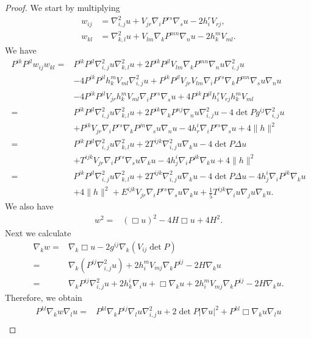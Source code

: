 \documentclass{amsart}
\theoremstyle{definition}
\theoremstyle{remark}
\numberwithin{equation}{section}
\begin{document}
\begin{proof}
We start by multiplying
\begin{align*}
w_{ij}&=\nabla^2_{i,j}u+V_{jr}\nabla_iP^{rs}\nabla_su-2h_i^rV_{rj},\\
w_{kl}&=\nabla^2_{k,l}u+V_{lm}\nabla_kP^{mn}\nabla_nu-2h_k^mV_{ml}.
\end{align*}
We have
\begin{align*}
P^{ik}P^{jl}w_{ij}w_{kl}=&P^{ik}P^{jl}\nabla^2_{i,j}u\nabla^2_{k,l}u+2P^{ik}P^{jl}V_{lm}\nabla_kP^{mn}\nabla_nu\nabla^2_{i,j}u\\
&-4P^{ik}P^{jl}h_k^mV_{ml}\nabla^2_{i,j}u+P^{ik}P^{jl}V_{jr}V_{lm}\nabla_iP^{rs}\nabla_kP^{mn}\nabla_su\nabla_nu\\
&-4P^{ik}P^{jl}V_{jr}h_k^mV_{ml}\nabla_iP^{rs}\nabla_su+4P^{ik}P^{jl}h_i^rV_{rj}h_k^mV_{ml}\\
=&P^{ik}P^{jl}\nabla^2_{i,j}u\nabla^2_{k,l}u+2P^{ik}\nabla_kP^{nj}\nabla_nu\nabla^2_{i,j}u-4\det P g^{ij}\nabla^2_{i,j}u\\
&+P^{ik}V_{jr}\nabla_iP^{rs}\nabla_kP^{jn}\nabla_su\nabla_nu-4h^i_r\nabla_iP^{rs}\nabla_su+4\|h\|^2\\
=&P^{ik}P^{jl}\nabla^2_{i,j}u\nabla^2_{k,l}u+ {2T^{ijk}\nabla^2_{i,j}u\nabla_ku}-4\det P \Delta u\\
&+T^{ijk}V_{jr}\nabla_iP^{rs}\nabla_su\nabla_ku-4h_{j}^i\nabla_iP^{jk}\nabla_ku+ {4\|h\|^2}\\
=&P^{ik}P^{jl}\nabla^2_{i,j}u\nabla^2_{k,l}u+ {2T^{ijk}\nabla^2_{i,j}u\nabla_ku}-4\det P \Delta u-4h_{j}^i\nabla_iP^{jk}\nabla_ku\\
&+ {4\|h\|^2}+E^{ijk}V_{jr}\nabla_iP^{rs}\nabla_su\nabla_ku+\frac{1}{5}T^{ijk}\nabla_iu\nabla_ju\nabla_ku.
\end{align*}
We also have
\begin{align*}
w^2=& {(\Box u)^2-4H\Box u}+ {4H^2}.
\end{align*}
Next we calculate
\begin{align*}
\nabla_k w=&\nabla_k\Box u-2g^{ij}\nabla_k(V_{ij}\det P)\\
=&\nabla_k(P^{ij}\nabla^2_{i,j} u)+2h_i^mV_{mj}\nabla_kP^{ij}-2H\nabla_ku\\
=&\nabla_kP^{ij}\nabla^2_{i,j}u+2h_k^i\nabla_iu+\Box\nabla_ku+2h_i^mV_{mj}\nabla_kP^{ij}-2H\nabla_ku.
\end{align*}
Therefore, we obtain
\begin{align*}
P^{kl}\nabla_k w\nabla_lu
=&P^{kl}\nabla_kP^{ij}\nabla_lu\nabla^2_{i,j}u+2\det P|\nabla u|^2+P^{kl}\Box\nabla_ku\nabla_lu\\

\end{align*}
\end{proof}
\end{document}
